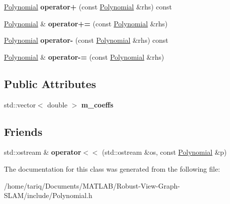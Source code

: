 \begin{DoxyCompactItemize}
\item 
\hyperlink{classPolynomial}{Polynomial} {\bfseries operator+} (const \hyperlink{classPolynomial}{Polynomial} \&rhs) const \hypertarget{classPolynomial_a42b8d27c68921d613367826990644e70}{}\label{classPolynomial_a42b8d27c68921d613367826990644e70}

\item 
\hyperlink{classPolynomial}{Polynomial} \& {\bfseries operator+=} (const \hyperlink{classPolynomial}{Polynomial} \&rhs)\hypertarget{classPolynomial_a0309358e97b5a50b2fe13f5242d68f38}{}\label{classPolynomial_a0309358e97b5a50b2fe13f5242d68f38}

\item 
\hyperlink{classPolynomial}{Polynomial} {\bfseries operator-\/} (const \hyperlink{classPolynomial}{Polynomial} \&rhs) const \hypertarget{classPolynomial_acff0b8a8c385f43f9d57c80ee925d858}{}\label{classPolynomial_acff0b8a8c385f43f9d57c80ee925d858}

\item 
\hyperlink{classPolynomial}{Polynomial} \& {\bfseries operator-\/=} (const \hyperlink{classPolynomial}{Polynomial} \&rhs)\hypertarget{classPolynomial_a19e1abe808b7cc063edef7249c2b2bbf}{}\label{classPolynomial_a19e1abe808b7cc063edef7249c2b2bbf}

\end{DoxyCompactItemize}
\subsection*{Public Attributes}
\begin{DoxyCompactItemize}
\item 
std\+::vector$<$ double $>$ {\bfseries m\+\_\+coeffs}\hypertarget{classPolynomial_a67e77ed96a49e4f16be5c6be158e7e24}{}\label{classPolynomial_a67e77ed96a49e4f16be5c6be158e7e24}

\end{DoxyCompactItemize}
\subsection*{Friends}
\begin{DoxyCompactItemize}
\item 
std\+::ostream \& {\bfseries operator$<$$<$} (std\+::ostream \&os, const \hyperlink{classPolynomial}{Polynomial} \&p)\hypertarget{classPolynomial_af1fdf53b29100b084772816cb9ecc8ac}{}\label{classPolynomial_af1fdf53b29100b084772816cb9ecc8ac}

\end{DoxyCompactItemize}


The documentation for this class was generated from the following file\+:\begin{DoxyCompactItemize}
\item 
/home/tariq/\+Documents/\+M\+A\+T\+L\+A\+B/\+Robust-\/\+View-\/\+Graph-\/\+S\+L\+A\+M/include/Polynomial.\+h\end{DoxyCompactItemize}
